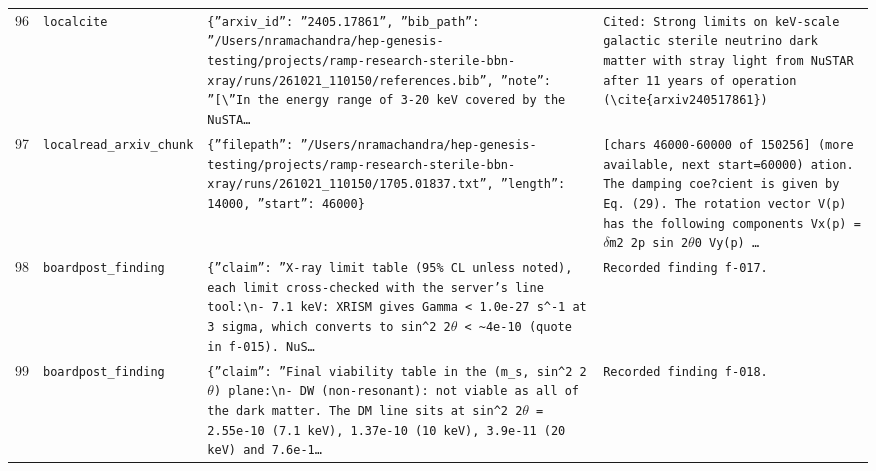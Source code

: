 \documentclass[11pt,a4paper]{article}
\begin{document}
\begin{longtable}{@{}p{}p{}p{}p{}@{}}
96 & \texttt{local}\newline\texttt{cite} & \texttt{\{''arxiv\_\allowbreak{}id'':\allowbreak{} ''2405.17861'',\allowbreak{} ''bib\_\allowbreak{}path'':\allowbreak{} ''/\allowbreak{}Users/\allowbreak{}nramachandra/\allowbreak{}hep-genesis-testing/\allowbreak{}projects/\allowbreak{}ramp-research-sterile-bbn-xray/\allowbreak{}runs/\allowbreak{}261021\_\allowbreak{}110150/\allowbreak{}references.bib'',\allowbreak{} ''note'':\allowbreak{} ''[\textbackslash{}\allowbreak{}''In the energy range of 3-20 keV covered by the NuSTA\ldots{}\allowbreak{}} & \texttt{Cited:\allowbreak{} Strong limits on keV-scale galactic sterile neutrino dark matter with stray light from NuSTAR after 11 years of operation (\textbackslash{}\allowbreak{}cite\{arxiv240517861\}\allowbreak{})\allowbreak{}} \\
97 & \texttt{local}\newline\texttt{read\_\allowbreak{}arxiv\_\allowbreak{}chunk} & \texttt{\{''filepath'':\allowbreak{} ''/\allowbreak{}Users/\allowbreak{}nramachandra/\allowbreak{}hep-genesis-testing/\allowbreak{}projects/\allowbreak{}ramp-research-sterile-bbn-xray/\allowbreak{}runs/\allowbreak{}261021\_\allowbreak{}110150/\allowbreak{}1705.01837.txt'',\allowbreak{} ''length'':\allowbreak{} 14000,\allowbreak{} ''start'':\allowbreak{} 46000\}\allowbreak{}} & \texttt{[chars 46000-60000 of 150256]\allowbreak{} (more available,\allowbreak{} next start=\allowbreak{}60000)\allowbreak{}  ation. The damping coe?cient is given by Eq. (29)\allowbreak{}. The rotation vector V(p)\allowbreak{} has the following components Vx(p)\allowbreak{} =\allowbreak{} $\delta$m2 2p sin 2$\theta$0 Vy(p)\allowbreak{} \ldots{}\allowbreak{}} \\
98 & \texttt{board}\newline\texttt{post\_\allowbreak{}finding} & \texttt{\{''claim'':\allowbreak{} ''X-ray limit table (95\% CL unless noted)\allowbreak{},\allowbreak{} each limit cross-checked with the server's line tool:\allowbreak{}\textbackslash{}\allowbreak{}n- 7.1 keV:\allowbreak{} XRISM gives Gamma \textless{}\allowbreak{} 1.0e-27 s\textasciicircum{}\allowbreak{}-1 at 3 sigma,\allowbreak{} which converts to sin\textasciicircum{}\allowbreak{}2 2$\theta$ \textless{}\allowbreak{} \textasciitilde{}\allowbreak{}4e-10 (quote in f-015)\allowbreak{}. NuS\ldots{}\allowbreak{}} & \texttt{Recorded finding f-017.} \\
99 & \texttt{board}\newline\texttt{post\_\allowbreak{}finding} & \texttt{\{''claim'':\allowbreak{} ''Final viability table in the (m\_\allowbreak{}s,\allowbreak{} sin\textasciicircum{}\allowbreak{}2 2$\theta$)\allowbreak{} plane:\allowbreak{}\textbackslash{}\allowbreak{}n- DW (non-resonant)\allowbreak{}:\allowbreak{} not viable as all of the dark matter. The DM line sits at sin\textasciicircum{}\allowbreak{}2 2$\theta$ =\allowbreak{} 2.55e-10 (7.1 keV)\allowbreak{},\allowbreak{} 1.37e-10 (10 keV)\allowbreak{},\allowbreak{} 3.9e-11 (20 keV)\allowbreak{} and 7.6e-1\ldots{}\allowbreak{}} & \texttt{Recorded finding f-018.} \\

\end{longtable}
\end{document}
